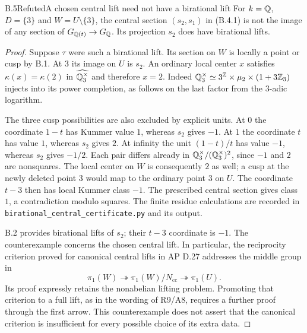 \begin{statement}{B.5}{Refuted}{A chosen central lift need not have a birational lift}
For $k=\mathbb Q$, $D=\{3\}$ and $W=U\setminus\{3\}$, the central
section $(s_2,s_1)$ in (B.4.1) is not the image of any section of
$G_{\mathbb Q(t)}\to G_\mathbb Q$.  Its projection $s_2$ does have birational
lifts.
\end{statement}
\begin{proof}
Suppose $\tau$ were such a birational lift.  Its section on $W$ is
locally a point or cusp by B.1.  At $3$ its image on $U$ is $s_2$.
An ordinary local center $x$ satisfies
$\kappa(x)=\kappa(2)$ in $\widehat{\mathbb Q_3^\times}$ and therefore
$x=2$.  Indeed
$\mathbb Q_3^\times\simeq3^\mathbb Z\times\mu_2\times(1+3\mathbb Z_3)$ injects
into its power completion, as follows on the last factor from the
$3$-adic logarithm.

The three cusp possibilities are also excluded by explicit units.
At $0$ the coordinate $1-t$ has Kummer value $1$, whereas $s_2$
gives $-1$.  At $1$ the coordinate $t$ has value $1$, whereas
$s_2$ gives $2$.  At infinity the unit $(1-t)/t$ has value $-1$,
whereas $s_2$ gives $-1/2$.  Each pair differs already in
$\mathbb Q_3^\times/(\mathbb Q_3^\times)^2$, since $-1$ and $2$ are nonsquares.
The local center on $W$ is consequently $2$ as well; a cusp at
the newly deleted point $3$ would map to the ordinary point $3$
on $U$.  The coordinate $t-3$ then has local Kummer class $-1$.
The prescribed central section gives class $1$, a contradiction
modulo squares.  The finite residue calculations are recorded in
\texttt{birational\_central\_certificate.py} and its output.

B.2 provides birational lifts of $s_2$; their $t-3$ coordinate is
$-1$.  The counterexample concerns the chosen central lift.  In
particular, the reciprocity criterion proved for canonical central
lifts in AP D.27 addresses the middle group in
\[
 \pi_1(W)\twoheadrightarrow\pi_1(W)/N_{\mathrm{cc}}
       \twoheadrightarrow\pi_1(U).
\]
Its proof expressly retains the nonabelian lifting problem.  Promoting
that criterion to a full lift, as in the wording of R9/A8, requires
a further proof through the first arrow.  This counterexample does
not assert that the canonical criterion is insufficient for every
possible choice of its extra data.
\end{proof}

